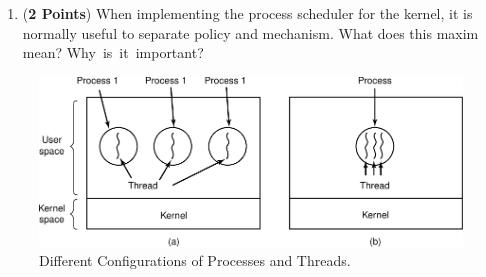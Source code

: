 \documentclass[12pt,epsf,psfig,graphics]{article}
\begin{document}
\begin{enumerate}
\begin{enumerate}
    \item ({\bf 2 Points}) When implementing the process scheduler for the kernel, it is normally useful to separate
      policy and mechanism.  What does this maxim mean? \mbox{Why is it important}?


  \end{enumerate}

  \newpage

  \begin{figure}[t]
    \centering
    \includegraphics{fig2-11}
    \caption{Different Configurations of Processes and Threads.}
    \label{fig:pandt}
  \end{figure}


\end{enumerate}
\end{document}
